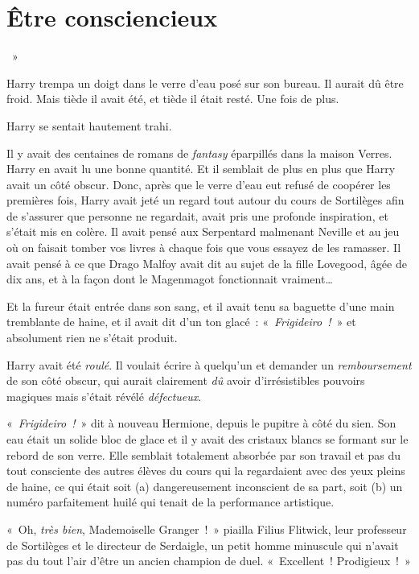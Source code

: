
\chapter{Être consciencieux}

~»

\hplettrineextrapara
Harry trempa un doigt dans le verre d'eau posé sur son bureau. Il aurait dû être froid. Mais tiède il avait été, et tiède il était resté. Une fois de plus.

Harry se sentait hautement trahi.

Il y avait des centaines de romans de \emph{fantasy} éparpillés dans la maison Verres. Harry en avait lu une bonne quantité. Et il semblait de plus en plus que Harry avait un côté obscur. Donc, après que le verre d'eau eut refusé de coopérer les premières fois, Harry avait jeté un regard tout autour du cours de Sortilèges afin de s'assurer que personne ne regardait, avait pris une profonde inspiration, et s'était mis en colère. Il avait pensé aux Serpentard malmenant Neville et au jeu où on faisait tomber vos livres à chaque fois que vous essayez de les ramasser. Il avait pensé à ce que Drago Malfoy avait dit au sujet de la fille Lovegood, âgée de dix ans, et à la façon dont le Magenmagot fonctionnait vraiment…

Et la fureur était entrée dans son sang, et il avait tenu sa baguette d'une main tremblante de haine, et il avait dit d'un ton glacé~: «~\emph{Frigideiro~!}~» et absolument rien ne s'était produit.

Harry avait été \emph{roulé}. Il voulait écrire à quelqu'un et demander un \emph{remboursement} de son côté obscur, qui aurait clairement \emph{dû} avoir d'irrésistibles pouvoirs magiques mais s'était révélé \emph{défectueux}.

«~\emph{Frigideiro~!}~» dit à nouveau Hermione, depuis le pupitre à côté du sien. Son eau était un solide bloc de glace et il y avait des cristaux blancs se formant sur le rebord de son verre. Elle semblait totalement absorbée par son travail et pas du tout consciente des autres élèves du cours qui la regardaient avec des yeux pleins de haine, ce qui était soit (a) dangereusement inconscient de sa part, soit (b) un numéro parfaitement huilé qui tenait de la performance artistique.

«~Oh, \emph{très bien}, Mademoiselle Granger~!~» piailla Filius Flitwick, leur professeur de Sortilèges et le directeur de Serdaigle, un petit homme minuscule qui n'avait pas du tout l'air d'être un ancien champion de duel. «~Excellent~! Prodigieux~!~»


